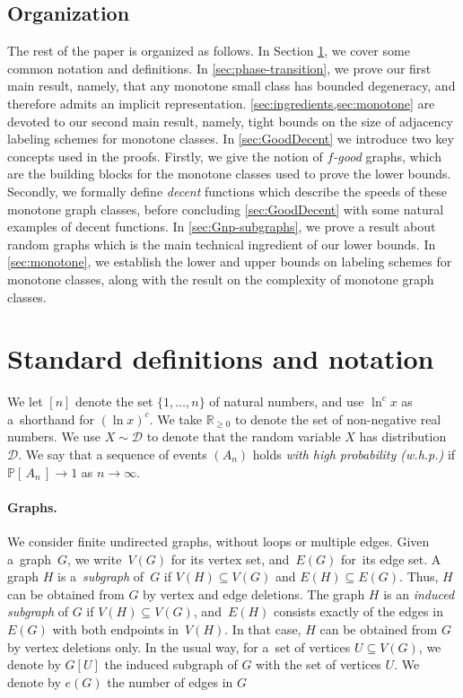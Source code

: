 \documentclass[letterpaper,11pt]{article}
\newcommand{\Rrr}{\mathbb{R}_{\geq 0}}
\theoremstyle{definition}
\theoremstyle{remark}
\renewcommand{\geq}{\geqslant}
\renewcommand{\Pr}[1]{\mathbb{P}\left[\,#1\,\right]}
\begin{document}
	
	\subsection{Organization}	
	The rest of the paper is organized as follows. 
	In Section \ref{sec:basics}, we cover some common notation and definitions. 
	In \cref{sec:phase-transition}, we prove our first main result, namely, that any monotone small class has bounded degeneracy, and therefore admits an implicit representation.
	\cref{sec:ingredients,sec:monotone} are devoted to our second main result, namely, tight bounds on the size of adjacency labeling schemes for monotone classes.
	In \cref{sec:GoodDecent} we introduce two key concepts used in the proofs. Firstly, we give the notion of \emph{$f$-good} graphs, which are the building blocks for the monotone classes used to prove the lower bounds. Secondly, we formally define \emph{decent} functions which describe the speeds of these monotone graph classes, before concluding \cref{sec:GoodDecent} with some natural examples of decent functions. In \cref{sec:Gnp-subgraphs}, we prove a result about random graphs which is the main technical ingredient of our lower bounds.
	In \cref{sec:monotone}, we establish the lower and upper bounds on labeling schemes for monotone classes, along with the result on the complexity of monotone graph classes.
	 	


	\section{Standard definitions and notation }\label{sec:basics}
    We let $[n]$  denote the set $\{1, \dots, n\}$ of natural numbers, and use $\ln^c x$ as a~shorthand for $(\ln x)^c$.  We take $\Rrr$ to denote the set of non-negative real numbers.    
    We use $X\sim \mathcal{D}$ to denote that the random variable $X$ has distribution $\mathcal{D}$. We say that a sequence of events $(A_n)$ holds \emph{with high probability (w.h.p.)} if $\Pr{A_n}\rightarrow 1$ as $n\rightarrow \infty$.
        
	\paragraph{Graphs.} We consider finite undirected graphs, without loops or multiple edges.
        Given a~graph~$G$, we write~$V(G)$ for its vertex set, and~$E(G)$ for~its edge set.	
	A graph $H$ is a~\emph{subgraph} of~$G$ if $V(H) \subseteq V(G)$ and $E(H) \subseteq E(G)$.
        Thus, $H$ can be obtained from $G$ by vertex and edge deletions.
	The graph $H$ is an \emph{induced subgraph} of $G$ if $V(H) \subseteq V(G)$,
	and~$E(H)$ consists exactly of the edges in~$E(G)$ with both endpoints in~$V(H)$.
        In that case, $H$ can be obtained from $G$ by vertex deletions only. In the usual way, for a~set of vertices $U\subseteq V(G)$, we denote by $G[U]$ the induced subgraph of $G$ with the set of vertices $U$.
        We denote by $e(G)$ the number of edges in $G$
        
\end{document}

